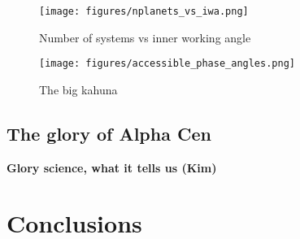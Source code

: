 \documentclass[
    usenatbib,
]{mnras}
\begin{document}

\begin{figure*}
    \centering
    \texttt{[image: figures/nplanets\_vs\_iwa.png]}  
    \caption{
        Number of systems vs inner working angle
    }
    \label{fig:accessible_phase_angles}
\end{figure*}


\begin{figure*}
    \centering
    \texttt{[image: figures/accessible\_phase\_angles.png]}  
    \caption{
        The big kahuna
    }
    \label{fig:betaallofit}
\end{figure*}


\subsection{The glory of Alpha Cen}%
\label{sec:ealpha-cen}
\textbf{Glory science, what it tells us (Kim)}




\section{Conclusions}
\end{document}
